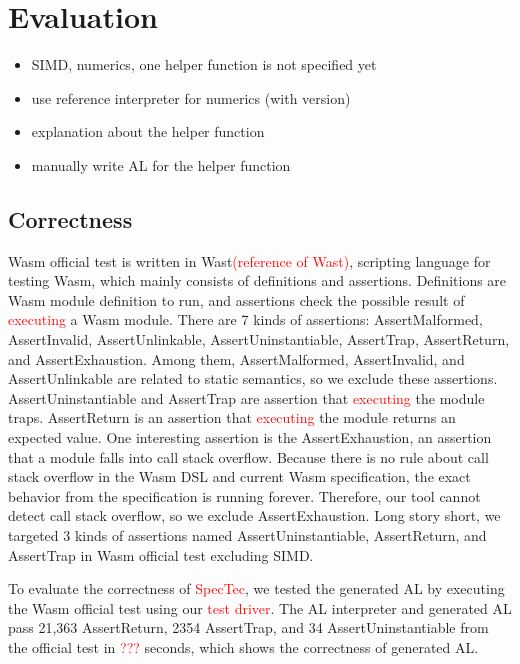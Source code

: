 \section{Evaluation}
\label{sec:eval}

\begin{itemize}
  \item SIMD, numerics, one helper function is not specified yet
  \item use reference interpreter for numerics (with version)
  \item explanation about the helper function
  \item manually write AL for the helper function
\end{itemize}

\subsection{Correctness}
Wasm official test is written in Wast\textcolor{red}{(reference of Wast)}, scripting language for testing Wasm, which mainly consists of definitions and assertions.
Definitions are Wasm module definition to run, and assertions check the possible result of \textcolor{red}{executing} a Wasm module.
There are 7 kinds of assertions: AssertMalformed, AssertInvalid, AssertUnlinkable, AssertUninstantiable, AssertTrap, AssertReturn, and AssertExhaustion.
Among them, AssertMalformed, AssertInvalid, and AssertUnlinkable are related to static semantics, so we exclude these assertions.
AssertUninstantiable and AssertTrap are assertion that \textcolor{red}{executing} the module traps.
AssertReturn is an assertion that \textcolor{red}{executing} the module returns an expected value.
One interesting assertion is the AssertExhaustion, an assertion that a module falls into call stack overflow.
Because there is no rule about call stack overflow in the Wasm DSL and current Wasm specification, the exact behavior from the specification is running forever.
Therefore, our tool cannot detect call stack overflow, so we exclude AssertExhaustion.
Long story short, we targeted 3 kinds of assertions named AssertUninstantiable, AssertReturn, and AssertTrap in Wasm official test excluding SIMD.

To evaluate the correctness of \textcolor{red}{SpecTec}, we tested the generated AL by executing the Wasm official test using our \textcolor{red}{test driver}.
The AL interpreter and generated AL pass 21,363 AssertReturn, 2354 AssertTrap, and 34 AssertUninstantiable from the official test in \textcolor{red}{???} seconds, which shows the correctness of generated AL.

